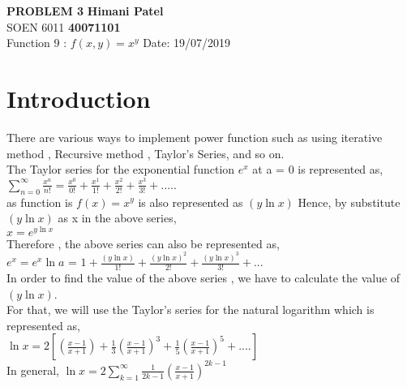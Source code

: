 \documentclass{article}
\begin{document}
\noindent
\large\textbf{PROBLEM 3} \hfill \textbf{Himani Patel} \\
\normalsize SOEN 6011 \hfill \textbf{40071101} \\
Function 9 :  $f(x,y)=x^y$  \hfill Date: 19/07/2019 \\

\section{Introduction}

\noindent There are various ways to implement power function such as using iterative method , Recursive method , Taylor's Series, and so on. \\
The Taylor series for the exponential function $e^x$ at a = 0 is represented as,\\

$\sum_{n=0}^{\infty} \frac{x^n}{n!}= \frac{x^0}{0!}+\frac{x^1}{1!} +\frac{x^2}{2!} +\frac{x^3}{3!}+ .....$\\

\noindent
as function is $f(x) = x^y$ is also represented as $(y \ln x)$ 
Hence, by substitute  $(y \ln x)$ as x in the above series,\\

$x = e^{y \ln x}$  \\

Therefore , the above series can also be represented as,\\

$e^x = e^x \ln a $ = $ 1 + \frac{(y\ln x) }{1!}+\frac{(y\ln x)^2}{2!} +\frac{(y\ln x)^3}{3!}+ ... $\\

\noindent
In order to find the value of the above series , we have to calculate the value of $(y\ln x)$.\\

\noindent
For that, we will use the Taylor's series for the natural logarithm which is represented as,\\

$\ln x = 2[(\frac{x-1}{x+1}) + \frac{1}{3}(\frac{x-1}{x+1})^3 + \frac{1}{5}(\frac{x-1}{x+1})^5 + ....]$ \\

In general, $\ln x = 2\sum_{k=1}^{\infty} \frac{1}{2k-1} (\frac{x-1}{x+1})^{2k-1}$ \\
\end{document}
